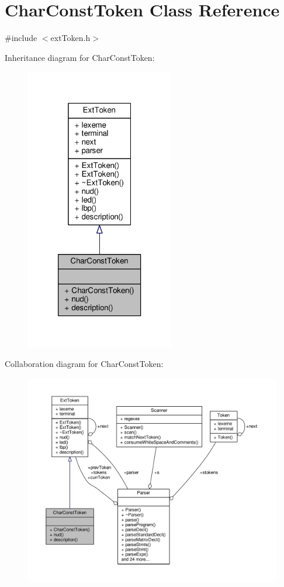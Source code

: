 \hypertarget{classCharConstToken}{\section{Char\-Const\-Token Class Reference}
\label{classCharConstToken}
}


{\ttfamily \#include $<$ext\-Token.\-h$>$}



Inheritance diagram for Char\-Const\-Token\-:\nopagebreak
\begin{figure}[H]
\begin{center}
\leavevmode
\includegraphics[width=184pt]{classCharConstToken__inherit__graph}
\end{center}
\end{figure}


Collaboration diagram for Char\-Const\-Token\-:\nopagebreak
\begin{figure}[H]
\begin{center}
\leavevmode
\includegraphics[width=350pt]{classCharConstToken__coll__graph}
\end{center}
\end{figure}
